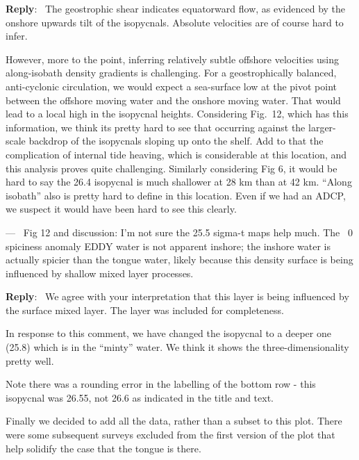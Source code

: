 \documentclass[11pt]{article}
\newcounter{reviewer}
\newcounter{point}[reviewer]
\renewcommand{\thepoint}{P\,\thereviewer.\arabic{point}}
\newenvironment{point}
   {\refstepcounter{point} \bigskip \noindent {\textbf{Reviewer~Point~\thepoint} } ---\ }
   {\par }
\newenvironment{reply}
   {\medskip \noindent \begin{sf}\textbf{Reply}:\  }
   {\medskip \end{sf}}
\begin{document}
\begin{reply}
    The geostrophic shear indicates equatorward flow, as evidenced by the onshore upwards tilt of the isopycnals.  Absolute velocities are of course hard to infer.

    However, more to the point, inferring relatively subtle offshore velocities using along-isobath density gradients is challenging.   For a geostrophically balanced, anti-cyclonic circulation, we would expect a sea-surface low at the pivot point between the offshore moving water and the onshore moving water.  That would lead to a local high in the isopycnal heights. Considering Fig.\ 12, which has this information, we think its pretty hard to see that occurring against the larger-scale backdrop of the isopycnals sloping up onto the shelf.  Add to that the complication of internal tide heaving, which is considerable at this location, and this analysis proves quite challenging.  Similarly considering Fig 6, it would be hard to say the 26.4 isopycnal is much shallower at 28 km than at 42 km.  ``Along isobath'' also is pretty hard to define in this location.   Even if we had an ADCP, we suspect it would have been hard to see this clearly.
\end{reply}

\begin{point}
    Fig 12 and discussion: I'm not sure the 25.5 sigma-t maps help much. The ~0 spiciness anomaly EDDY water is not apparent inshore; the inshore water is actually spicier than the tongue water, likely because this density surface is being influenced by shallow mixed layer processes.
\end{point}

\begin{reply}
    We agree with your interpretation that this layer is being influenced by the surface mixed layer.  The layer was included for completeness.

    In response to this comment, we have changed the isopycnal to a deeper one (25.8) which is in the ``minty'' water.  We think it shows the three-dimensionality pretty well.

    Note there was a rounding error in the labelling of the bottom row - this isopycnal was 26.55, not 26.6 as indicated in the title and text.

    Finally we decided to add all the data, rather than a subset to this plot.  There were some subsequent surveys excluded from the first version of the plot that help solidify the case that the tongue is there.
\end{reply}
\end{document}
